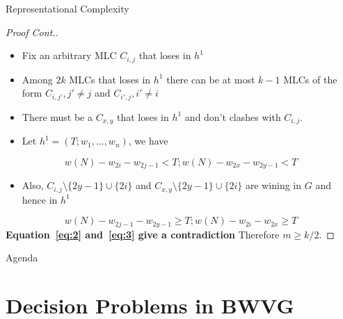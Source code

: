 \documentclass{beamer}
\begin{document}
\begin{frame}[fragile]{Representational Complexity}
  \begin{proof}[Proof Cont.]
    \begin{itemize}
      \item Fix an arbitrary MLC $C_{i,j}$ that loses in $h^1$
      \item Among $2k$ MLCs that loses in $h^1$ there can be at most $k - 1$ MLCs of the form
      $C_{i,j'}, j' \neq j$ and $C_{i',j}, i' \neq i$
      \item There must be a $C_{x,y}$ that loses in $h^1$ and don't clashes with $C_{i,j}$.
      \item Let $h^1 = (T; w_1, \dots, w_n)$, we have
    \end{itemize}
    \begin{equation}
      w(N) - w_{2i} - w_{2j - 1} < T; w(N) - w_{2x} - w_{2y - 1} < T\label{eq:2}
    \end{equation}
    \begin{itemize}
      \item Also, $C_{i,j} \setminus \{2y -1\} \cup \{2i\}$ and $C_{x,y} \setminus \{2y -1\} \cup \{2i\}$ are wining in $G$ and hence in $h^1$
    \end{itemize}
    \begin{equation}
      w(N) - w_{2j - 1} - w_{2y - 1} \geq T; w(N) - w_{2i} - w_{2x} \geq T\label{eq:3}
    \end{equation}
    \textbf{Equation~\ref{eq:2} and~\ref{eq:3} give a contradiction}
    Therefore $m \geq k/2$.
\end{proof}
\end{frame}


\begin{frame}[fragile]{Agenda}
  \section{Decision Problems in BWVG}
  \tableofcontents[currentsection]
\end{frame}
\end{document}
